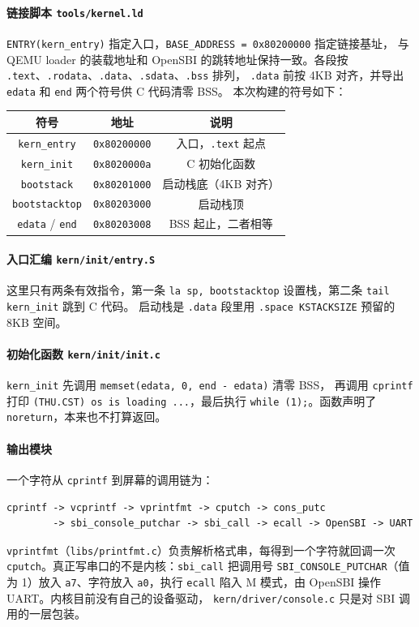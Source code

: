 \documentclass[UTF8,a4paper,10pt,fontset=none]{ctexart}
\begin{document}
\paragraph{链接脚本 \texttt{tools/kernel.ld}}
\texttt{ENTRY(kern\_entry)} 指定入口，\texttt{BASE\_ADDRESS = 0x80200000} 指定链接基址，
与 QEMU loader 的装载地址和 OpenSBI 的跳转地址保持一致。各段按
\texttt{.text}、\texttt{.rodata}、\texttt{.data}、\texttt{.sdata}、\texttt{.bss} 排列，
\texttt{.data} 前按 4KB 对齐，并导出 \texttt{edata} 和 \texttt{end} 两个符号供 C 代码清零 BSS。
本次构建的符号如下：

\begin{table}[H]
    \centering
    \begin{tabular}{|c|c|c|}
        \hline
        符号 & 地址 & 说明 \\
        \hline
        \texttt{kern\_entry} & \texttt{0x80200000} & 入口，\texttt{.text} 起点 \\
        \texttt{kern\_init} & \texttt{0x8020000a} & C 初始化函数 \\
        \texttt{bootstack} & \texttt{0x80201000} & 启动栈底（4KB 对齐） \\
        \texttt{bootstacktop} & \texttt{0x80203000} & 启动栈顶 \\
        \texttt{edata} / \texttt{end} & \texttt{0x80203008} & BSS 起止，二者相等 \\
        \hline
    \end{tabular}
\end{table}

\paragraph{入口汇编 \texttt{kern/init/entry.S}}
这里只有两条有效指令，第一条
\texttt{la sp, bootstacktop} 设置栈，第二条 \texttt{tail kern\_init} 跳到 C 代码。
启动栈是 \texttt{.data} 段里用 \texttt{.space KSTACKSIZE} 预留的 8KB 空间。

\paragraph{初始化函数 \texttt{kern/init/init.c}}
\texttt{kern\_init} 先调用 \texttt{memset(edata, 0, end - edata)} 清零 BSS，
再调用 \texttt{cprintf} 打印 \texttt{(THU.CST) os is loading ...}，最后执行
\texttt{while (1);}。函数声明了 \texttt{noreturn}，本来也不打算返回。

\paragraph{输出模块}
一个字符从 \texttt{cprintf} 到屏幕的调用链为：
\begin{verbatim}
cprintf -> vcprintf -> vprintfmt -> cputch -> cons_putc
        -> sbi_console_putchar -> sbi_call -> ecall -> OpenSBI -> UART
\end{verbatim}
\texttt{vprintfmt}（\texttt{libs/printfmt.c}）负责解析格式串，每得到一个字符就回调一次
\texttt{cputch}。真正写串口的不是内核：\texttt{sbi\_call} 把调用号
\texttt{SBI\_CONSOLE\_PUTCHAR}（值为 1）放入 \texttt{a7}、字符放入 \texttt{a0}，执行
\texttt{ecall} 陷入 M 模式，由 OpenSBI 操作 UART。内核目前没有自己的设备驱动，
\texttt{kern/driver/console.c} 只是对 SBI 调用的一层包装。
\end{document}

